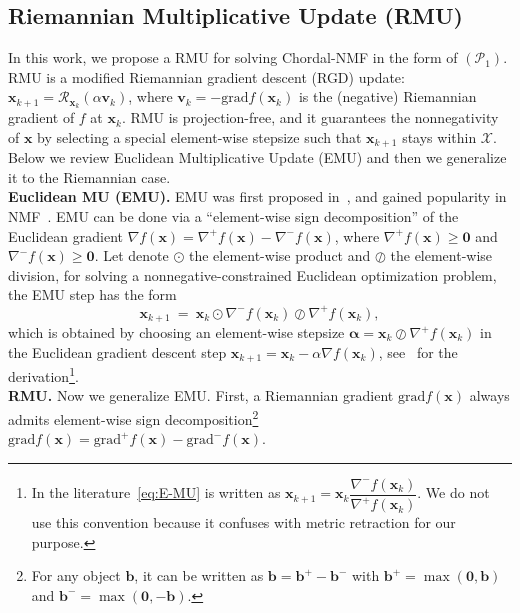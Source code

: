 \documentclass[sn-mathphys-num]{sn-jnl}
\def\grad            {\textrm{grad}}     %
\def\zeros           {\bm{0}}            %
\def\b {\bm{b}}
\def\v {\bm{v}}
\def\x {\bm{x}}
\def\cP { \mathcal{P}}
\def\cR { \mathcal{R}}
\def\cX { \mathcal{X}}
\def\balpha   {\boldsymbol{\alpha}}
\begin{document}
\subsection{Riemannian Multiplicative Update (RMU)}\label{sec:tool:subsec:RMU}
In this work, we propose a RMU for solving Chordal-NMF in the form of $(\cP_1)$.
RMU is a modified  Riemannian gradient descent (RGD) update: $\x_{k+1} = \cR_{\x_k}( \alpha \v_k)$, where $\v_k = -\grad f(\x_k)$ is the (negative) Riemannian gradient of $f$ at $\x_k$.
RMU is projection-free, and it guarantees the nonnegativity of $\x$ by selecting a special element-wise stepsize such that $\x_{k+1}$ stays within $\cX$.
Below we review Euclidean Multiplicative Update (EMU) and then we generalize it to the Riemannian case.
\\

\noindent\textbf{Euclidean MU (EMU).}
EMU was first proposed in~\cite{richardson1972bayesian,lucy1974iterative,daube1986iterative}, and gained popularity in NMF~\cite{gillis2020nonnegative}.
EMU can be done via a ``element-wise sign decomposition'' of the Euclidean gradient $\nabla f(\x) = \nabla^+ f(\x) - \nabla^- f(\x)$, where $\nabla^+ f(\x) \geq \zeros$ and $\nabla^- f(\x) \geq \zeros$.
Let denote $\odot$ the element-wise product and $\oslash $ the element-wise division, for solving a nonnegative-constrained Euclidean optimization problem, 
the EMU step has the form
\begin{equation}\label{eq:E-MU}
\x_{k+1} 
~=~
\x_k 
\odot
\nabla^-f(\x_k)
\oslash 
\nabla^+f(\x_k),
\tag{EMU}
\end{equation}
which is obtained by choosing an element-wise stepsize $\balpha=\x_k \oslash \nabla^+f(\x_k)$ in the Euclidean gradient descent step $\x_{k+1}=\x_k-\alpha\nabla f(\x_k)$, see~\cite{yoo2008orthogonal} for the derivation\footnote{In the literature~\eqref{eq:E-MU} is written as $\x_{k+1}=\x_k\dfrac{\nabla^-f(\x_k)}{\nabla^+f(\x_k)}$.
We do not use this convention because it confuses with metric retraction for our purpose.}.
\\





\noindent\textbf{RMU.}
Now we generalize EMU.
First, a Riemannian gradient $\grad f(\x)$ always admits element-wise sign decomposition\footnote{For any object $\b$, it can be written as $\b=\b^+-\b^-$ with $\b^+=\max(\zeros,\b)$ and $\b^-=\max(\zeros,-\b)$.}
$\grad f(\x) = \grad^+ f(\x) - \grad^- f(\x)$.
\end{document}

